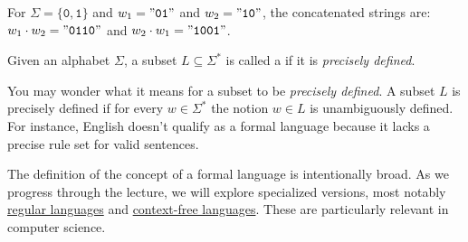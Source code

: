\exampleEng
For \( \Sigma = \{\mathtt{0}, \mathtt{1}\} \) and \( w_1 = \mathtt{"01"} \) and \( w_2 = \mathtt{"10"} \), the concatenated strings are:
\\[0.2cm]
\hspace*{1.3cm}
\( w_1 \cdot w_2 = \mathtt{"0110"} \) and \( w_2 \cdot w_1 = \mathtt{"1001"} \). \eox
\begin{Definition} \hspace*{\fill} \linebreak
Given an alphabet \( \Sigma \), a subset \( L \subseteq \Sigma^* \) is called a  if it is
\emph{precisely defined}.  \eox
\end{Definition}
You may wonder what it means for a subset to be \emph{precisely defined}.  A subset $L$ is precisely defined if
for every $w \in \Sigma^*$ the notion $w \in L$ is unambiguously defined.  For instance, English doesn't
qualify as a formal language because it lacks a precise rule set for valid sentences.
\vspace*{0.2cm}

The  definition of the concept of a formal language is intentionally broad. As we progress through the lecture,
we will explore specialized
versions, most notably \href{http://en.wikipedia.org/wiki/Regular_language}{regular languages}
 and \href{http://en.wikipedia.org/wiki/Context-free_language}{context-free
languages}.  These are particularly relevant in computer science.


